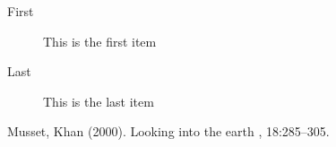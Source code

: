 \documentclass[DIV=calc, paper=a4, fontsize=11pt, twocolumn]{scrartcl}	 %
\begin{document}
\lipsum[8] %

\begin{description}
\item[First] This is the first item
\item[Last] This is the last item
\end{description}

\lipsum[9] %


\begin{thebibliography}{99} %

\bibitem[Cambridge, 2000]{}
Musset, Khan (2000).
\newblock Looking into the earth
, 18:285--305.
 
\end{thebibliography}

\end{document}

